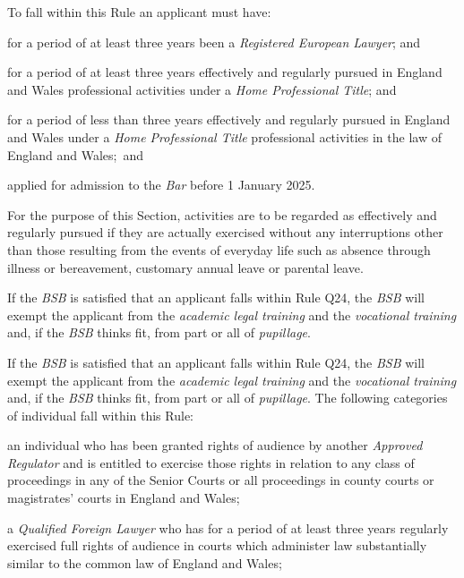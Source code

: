 To fall within this Rule an applicant must have:

\nl  \item for a period of at least three years been a \emph{Registered European
Lawyer}; and

 \item for a period of at least three years effectively and regularly
pursued in England and Wales professional activities under a \emph{Home
Professional Title}; and

 \item  for a period of less than three years effectively and regularly
pursued in England and Wales under a \emph{Home Professional Title}
professional activities in the law of England and Wales;~and

 \item applied for admission to the \emph{Bar} before 1 January 2025.\ln


For the purpose of this Section, activities are to be regarded as
effectively and regularly pursued if they are actually exercised without
any interruptions other than those resulting from the events of everyday
life such as absence through illness or bereavement, customary annual
leave or parental leave.




If the \emph{BSB} is satisfied that an applicant falls within Rule Q24,
the \emph{BSB} will exempt the applicant from the \emph{academic legal
training} and the \emph{vocational training} and, if the \emph{BSB}
thinks fit, from part or all of \emph{pupillage}.


If the \emph{BSB} is satisfied that an applicant falls within Rule Q24,
the \emph{BSB} will exempt the applicant from the \emph{academic legal
training} and the \emph{vocational training} and, if the \emph{BSB}
thinks fit, from part or all of \emph{pupillage}. The following
categories of individual fall within this Rule:
\nl
 \item an individual who has been granted rights of audience by another
\emph{Approved Regulator} and is entitled to exercise those rights in
relation to any class of proceedings in any of the Senior Courts or all
proceedings in county courts or magistrates' courts in England and
Wales;

 \item a \emph{Qualified Foreign Lawyer} who has for a period of at least
three years regularly exercised full rights of audience in courts which
administer law substantially similar to the common law of England and
Wales;

